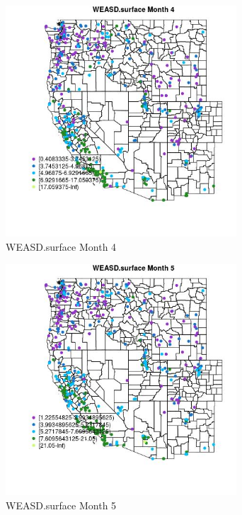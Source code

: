 \begin{figure} 
\centering  
\includegraphics[width=0.77\textwidth]{Code_Outputs/ML_input_report_ML_input_PM25_Step5_part_d_de_duplicated_aves_ML_input_MapObsMo4WEASDsurface.jpg} 
\caption{\label{fig:ML_input_report_ML_input_PM25_Step5_part_d_de_duplicated_aves_ML_inputMapObsMo4WEASDsurface}WEASD.surface Month 4} 
\end{figure} 
 

\begin{figure} 
\centering  
\includegraphics[width=0.77\textwidth]{Code_Outputs/ML_input_report_ML_input_PM25_Step5_part_d_de_duplicated_aves_ML_input_MapObsMo5WEASDsurface.jpg} 
\caption{\label{fig:ML_input_report_ML_input_PM25_Step5_part_d_de_duplicated_aves_ML_inputMapObsMo5WEASDsurface}WEASD.surface Month 5} 
\end{figure} 
 

